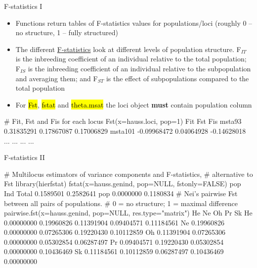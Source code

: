 \documentclass[compress, ucs, xelatex, 11pt, xcolor=svgnames,
  hyperref={
    bookmarks=true,
    unicode=true,
    colorlinks=true,
    pdftitle={Molecular data in R},
    plainpages=false,
    pdfauthor={Vojtech Zeisek},
    pdfsubject={Course about phylogeny and evolution in R},
    pdfcreator={XeLaTeX},
    pdfkeywords={R, evolution, phylogeny, molecular data},
    linkcolor=Tomato,
    anchorcolor=SaddleBrown,
    citecolor=Goldenrod,
    filecolor=DarkMagenta,
    menucolor=Sienna,
    urlcolor=DarkTurquoise,
    pdftex},
  url={hyphens, lowtilde} %
  ]{beamer}
\renewcommand{\texttt}[1]{\hl{\ttfamily #1}}
\begin{document}
\begin{frame}[fragile]{F-statistics I}
  \begin{itemize}
    \item Functions return tables of F-statistics values for populations/loci (roughly 0 -- no structure, 1 -- fully structured)
    \item The different \href{https://en.wikipedia.org/wiki/F-statistics}{F-statistics} look at different levels of population structure. F$_{IT}$ is the inbreeding coefficient of an individual relative to the total population; F$_{IS}$ is the inbreeding coefficient of an individual relative to the subpopulation and averaging them; and F$_{ST}$ is the effect of subpopulations compared to the total population
    \item For \texttt{Fst}, \texttt{fstat} and \texttt{theta.msat} the loci object \textbf{must} contain population column
  \end{itemize}
  \begin{spluscode}
    # Fit, Fst and Fis for each locus
    Fst(x=hauss.loci, pop=1)
                    Fit        Fst         Fis
    msta93   0.31835291 0.17867087  0.17006829
    msta101 -0.09968472 0.04064928 -0.14628018
        ...         ...        ...         ...
  \end{spluscode}
\end{frame}

\begin{frame}[fragile]{F-statistics II}
  \begin{spluscode}
    # Multilocus estimators of variance components and F-statistics,
    # alternative to Fst
    library(hierfstat)
    fstat(x=hauss.genind, pop=NULL, fstonly=FALSE)
                pop       Ind
    Total 0.1589501 0.2582641
    pop   0.0000000 0.1180834
    # Nei's pairwise Fst between all pairs of populations.
    # 0 = no structure; 1 = maximal difference
    pairwise.fst(x=hauss.genind, pop=NULL, res.type="matrix")
               He         Ne         Oh         Pr         Sk
    He 0.00000000 0.19960826 0.11391904 0.09404571 0.11184561
    Ne 0.19960826 0.00000000 0.07265306 0.19220430 0.10112859
    Oh 0.11391904 0.07265306 0.00000000 0.05302854 0.06287497
    Pr 0.09404571 0.19220430 0.05302854 0.00000000 0.10436469
    Sk 0.11184561 0.10112859 0.06287497 0.10436469 0.00000000
  \end{spluscode}
\end{frame}
\end{document}
